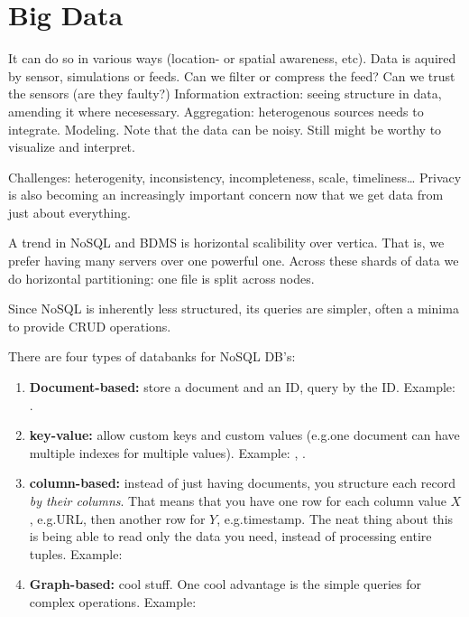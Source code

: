 \section{Big Data} It can do so in various ways
(location- or spatial awareness, etc).
Data is aquired by sensor, simulations or feeds. Can we filter or compress the feed?
Can we trust the sensors (are they faulty?)
Information extraction: seeing structure in data, amending it where necesessary.
Aggregation: heterogenous sources needs to integrate.
Modeling. Note that the data can be noisy. Still might be worthy to visualize and interpret.

Challenges: heterogenity, inconsistency, incompleteness, scale, timeliness\dots
Privacy is also becoming an increasingly important concern now that we get data from just about everything.

A trend in NoSQL and BDMS is horizontal scalibility over vertica. That is, we prefer having many 
servers over one powerful one. Across these shards of data we do horizontal partitioning: one file is 
split across nodes.

Since NoSQL is inherently less structured, its queries are simpler, often a minima to provide CRUD operations. 

There are four types of databanks for NoSQL DB's:
\begin{enumerate}
    \item \textbf{Document-based:} store a document and an ID, query by the ID.\@
        \newline Example: .
    \item \textbf{key-value:} allow custom keys and custom values (e.g.\@ one document can have multiple indexes for multiple values).
        \newline Example: , .
    \item \textbf{column-based:} instead of just having documents, you structure each record \textit{by their columns}. That means that you have one row for each column value $X$, e.g.\@ URL, then another row for $Y$, e.g.\@ timestamp. The neat thing about this is being able to read only the data you need, instead of processing
        entire tuples.
        \newline Example: 
    \item \textbf{Graph-based:} cool stuff. One cool advantage is the simple queries for complex operations.
        \newline Example: 
\end{enumerate}

